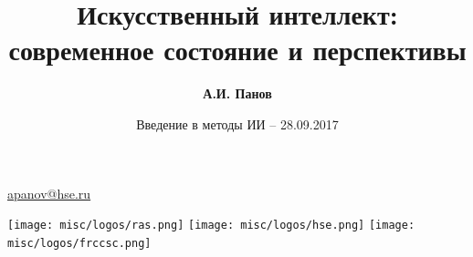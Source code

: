 \documentclass[default]{beamer}
\begin{document}
	
	\title[Направления и перспективы ИИ]{Искусственный интеллект: современное состояние и перспективы}
	\author[А.И. Панов]{\textbf{А.И. Панов}}
	\date{Введение в методы ИИ -- 28.09.2017} 
	
	{
	\begin{frame}
		
		\titlepage
		\centering
		\href{mailto:apanov@hse.ru}{apanov@hse.ru}
		\par\bigskip
		\texttt{[image: misc/logos/ras.png]} \hspace{10pt}
		\texttt{[image: misc/logos/hse.png]} \hspace{10pt}
		\texttt{[image: misc/logos/frccsc.png]} 
		
	\end{frame}
	}	
\end{document}
